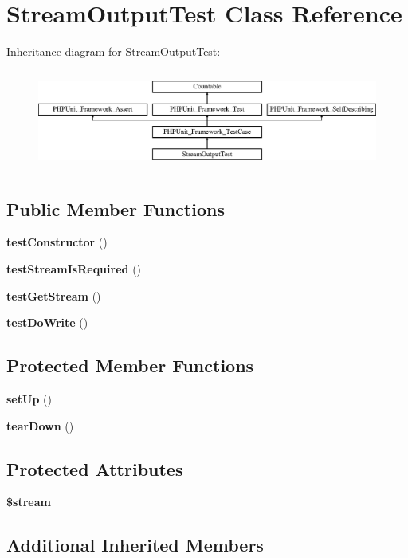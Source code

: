 \section{Stream\+Output\+Test Class Reference}
\label{class_symfony_1_1_component_1_1_console_1_1_tests_1_1_output_1_1_stream_output_test}
Inheritance diagram for Stream\+Output\+Test\+:\begin{figure}[H]
\begin{center}
\leavevmode
\includegraphics[height=3.303835cm]{class_symfony_1_1_component_1_1_console_1_1_tests_1_1_output_1_1_stream_output_test}
\end{center}
\end{figure}
\subsection*{Public Member Functions}
\begin{DoxyCompactItemize}
\item 
{\bf test\+Constructor} ()
\item 
{\bf test\+Stream\+Is\+Required} ()
\item 
{\bf test\+Get\+Stream} ()
\item 
{\bf test\+Do\+Write} ()
\end{DoxyCompactItemize}
\subsection*{Protected Member Functions}
\begin{DoxyCompactItemize}
\item 
{\bf set\+Up} ()
\item 
{\bf tear\+Down} ()
\end{DoxyCompactItemize}
\subsection*{Protected Attributes}
\begin{DoxyCompactItemize}
\item 
{\bf \$stream}
\end{DoxyCompactItemize}
\subsection*{Additional Inherited Members}


